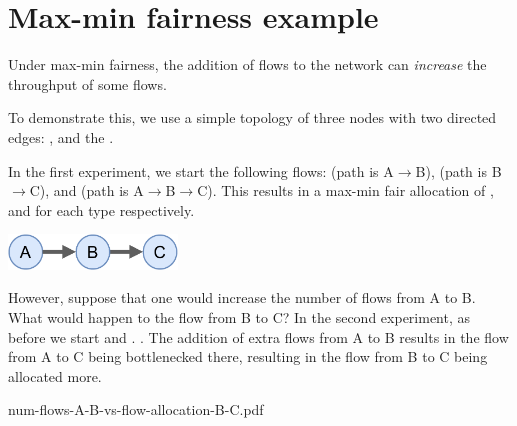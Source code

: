 \section{Max-min fairness example}

Under max-min fairness, the addition of flows to the network can \emph{increase} the throughput of some flows.

To demonstrate this, we use a simple topology of three nodes with two directed edges:
,
and the .

In the first experiment, we start the following flows:  (path is A$\rightarrow$B),  (path is B$\rightarrow$C), and  (path is A$\rightarrow$B$\rightarrow$C).
This results in a max-min fair allocation of ,  and  for each type respectively.

\begin{center}
\includegraphics[width=4.5cm]{figures/topology-example.pdf}
\end{center}

However, suppose that one would increase the number of flows from A to B. What would happen to the flow from B to C? In the second experiment, as before we start  and . . The addition of extra flows from A to B results in the flow from A to C being bottlenecked there, resulting in the flow from B to C being allocated more.

\begin{center}
{num-flows-A-B-vs-flow-allocation-B-C.pdf}
\end{center}
